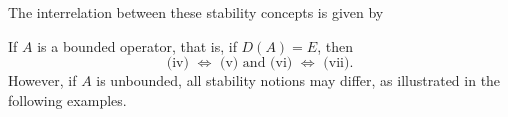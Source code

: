 The interrelation between these stability concepts is given by
\begin{center}
\end{center}
If $A$ is a bounded operator, that is, if $D(A) = E$, then
\[
\text{(iv) $\Leftrightarrow$ (v) and (vi) $\Leftrightarrow$ (vii).}
\]
However, if $A$ is unbounded, all stability notions may differ, as illustrated in the following examples.
